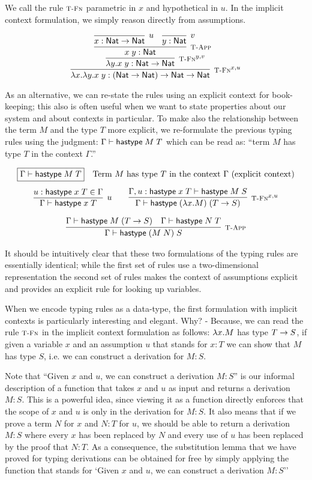 We call the rule $\textsc{\footnotesize T-Fn}$ parametric in $x$ and hypothetical in $u$.
In the implicit context formulation, we simply reason directly from
assumptions.


\[
\infer[\TFn^{x,u}]{\lam x. \lam y. x \app y : (\Nat \arrow \Nat) \arrow \Nat \arrow \Nat}
{\infer[\TFn^{y,v}]{\lam y.x \app y : \Nat \arrow \Nat}{
 \infer[\TApp]{x \app y : \Nat}
   {\infer[u]{x:\Nat \arrow \Nat}{} &
    \infer[v]{y:\Nat}{}
   }
 }
}
\]

As an alternative, we can re-state the rules using an explicit context for
book-keeping; this also is often useful when we want to state properties about
our system and about contexts in particular. To make also the
relationship between the term $M$ and the type $T$ more explicit, we
re-formulate the previous typing rules using the judgment: $\Gamma
\vdash \mathsf{hastype}\;M\;T$ which can be read as: ``term $M$ has type $T$
in the context $\Gamma$.''

\[
\begin{array}{c}
\multicolumn{1}{l}{\fbox{$\Gamma \vdash \tmhastype M
    T$}\quad\mbox{Term $M$ has type $T$ in the context $\Gamma$
    (explicit context)} } 
\\[1em]
\infer[u]{\Gamma \vdash \tmhastype x T}{u:\tmhastype x T \in \Gamma} \qquad
\infer[\TFn^{x,u}]{\Gamma \vdash \tmhastype {(\lam x.M)} {(T \arrow S)}}
                 {\Gamma, u:\tmhastype x T \vdash \tmhastype M S}
\\[1em]
\infer[\TApp]{\Gamma \vdash \tmhastype {(M \app N)} S}
             {\Gamma \vdash \tmhastype M (T \arrow S)
  & \Gamma \vdash \tmhastype N T}
\end{array}
\]

It should be intuitively clear that these two formulations of the typing rules
are essentially identical; while the first set of rules use a two-dimensional
representation the second set of rules makes the context of
assumptions explicit and provides an explicit rule for looking up variables.

When we encode typing rules as a data-type, the first formulation with implicit
contexts is particularly interesting and elegant. Why? - Because, we can read the
rule $\textsc{\footnotesize T-Fn}$ in the implicit context formulation as follows: $\lambda x.M$ has type $T \rightarrow S$, if given a variable
$x$ and an assumption $u$ that stands for $x:T$ we can show that $M$ has type
$S$, i.e. we can construct a derivation for $M:S$.

Note that ``Given $x$ and $u$, we can construct a derivation $M:S$'' is our
informal description of a function that takes $x$ and $u$ as input and returns a
derivation $M:S$. This is a powerful idea, since viewing it as a function
directly enforces that the scope of $x$ and $u$ is only in the derivation for
$M:S$. It also means that if we prove a term $N$ for $x$ and $N:T$ for $u$, we
should be able to return a derivation $M:S$ where every $x$ has been replaced
by $N$ and every use of $u$ has been replaced by the proof that $N:T$. As a
consequence, the substitution lemma that we have proved for typing derivations
can be obtained for free by simply applying the function that stands for `Given
$x$ and $u$, we can construct a derivation $M:S$''


